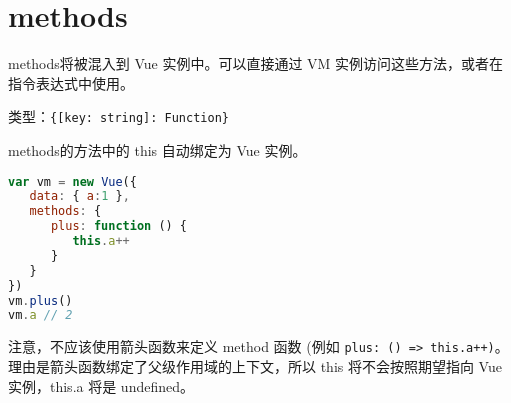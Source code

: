 \begin{lstlisting}[language=JavaScript]

\end{lstlisting}




\begin{lstlisting}[language=JavaScript]

\end{lstlisting}




\begin{lstlisting}[language=JavaScript]

\end{lstlisting}




\begin{lstlisting}[language=JavaScript]

\end{lstlisting}





\section{methods}

methods将被混入到 Vue 实例中。可以直接通过 VM 实例访问这些方法，或者在指令表达式中使用。

\begin{compactitem}
\item 类型：\texttt{\{[key: string]: Function\}}
\end{compactitem}

methods的方法中的 this 自动绑定为 Vue 实例。


\begin{lstlisting}[language=JavaScript]
var vm = new Vue({
   data: { a:1 },
   methods: {
      plus: function () {
         this.a++
      }
   }
})
vm.plus()
vm.a // 2
\end{lstlisting}

注意，不应该使用箭头函数来定义 method 函数 (例如 \texttt{plus: () => this.a++)}。理由是箭头函数绑定了父级作用域的上下文，所以 this 将不会按照期望指向 Vue 实例，this.a 将是 undefined。


\begin{lstlisting}[language=JavaScript]

\end{lstlisting}




\begin{lstlisting}[language=JavaScript]

\end{lstlisting}




